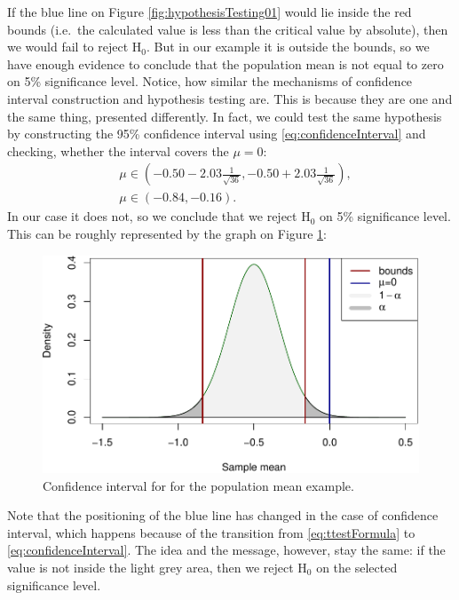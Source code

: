 \documentclass[
]{book}
\theoremstyle{definition}
\theoremstyle{definition}
\theoremstyle{definition}
\theoremstyle{definition}
\theoremstyle{remark}
\begin{document}
If the blue line on Figure \ref{fig:hypothesisTesting01} would lie inside the red bounds (i.e.~the calculated value is less than the critical value by absolute), then we would fail to reject \(\mathrm{H}_0\). But in our example it is outside the bounds, so we have enough evidence to conclude that the population mean is not equal to zero on 5\% significance level. Notice, how similar the mechanisms of confidence interval construction and hypothesis testing are. This is because they are one and the same thing, presented differently. In fact, we could test the same hypothesis by constructing the 95\% confidence interval using \eqref{eq:confidenceInterval} and checking, whether the interval covers the \(\mu=0\):
\begin{equation*}
    \begin{aligned}
        & \mu \in \left(-0.50 -2.03 \frac{1}{\sqrt{36}}, -0.50 + 2.03 \frac{1}{\sqrt{36}} \right), \\
        & \mu \in (-0.84, -0.16).
    \end{aligned}
\end{equation*}
In our case it does not, so we conclude that we reject \(\mathrm{H}_0\) on 5\% significance level. This can be roughly represented by the graph on Figure \ref{fig:hypothesisTesting02}:

\begin{figure}
\centering
\includegraphics{Svetunkov---Statistics-for-Business-Analytics_files/figure-latex/hypothesisTesting02-1.pdf}
\caption{\label{fig:hypothesisTesting02}Confidence interval for for the population mean example.}
\end{figure}

Note that the positioning of the blue line has changed in the case of confidence interval, which happens because of the transition from \eqref{eq:ttestFormula} to \eqref{eq:confidenceInterval}. The idea and the message, however, stay the same: if the value is not inside the light grey area, then we reject \(\mathrm{H}_0\) on the selected significance level.
\end{document}

